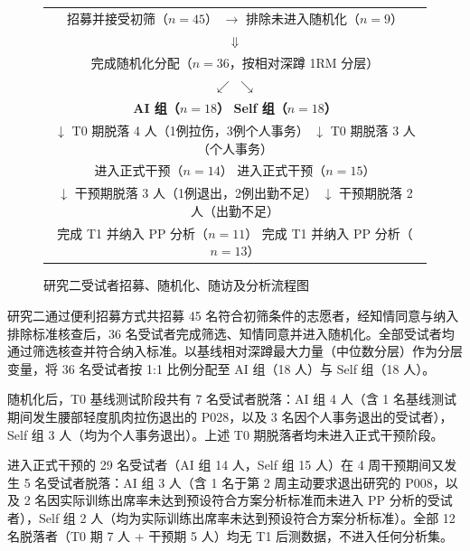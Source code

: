 \documentclass[UTF8,zihao=-4,twoside,openany]{ctexbook}
\begin{document}
\begin{figure}[htbp]
  \centering
  \small
  \begin{tabular}{|c|}
    \hline
    招募并接受初筛（$n=45$） $\longrightarrow$ 排除未进入随机化（$n=9$） \\
    $\Downarrow$ \\
    完成随机化分配（$n=36$，按相对深蹲 1RM 分层） \\
    $\swarrow$ \hspace{5.5cm} $\searrow$ \\
    \textbf{AI 组（$n=18$）} \hspace{5.5cm} \textbf{Self 组（$n=18$）} \\
    $\downarrow$ T0 期脱落 4 人（1例拉伤，3例个人事务） \hspace{0.5cm} $\downarrow$ T0 期脱落 3 人（个人事务） \\
    进入正式干预（$n=14$） \hspace{4.2cm} 进入正式干预（$n=15$） \\
    $\downarrow$ 干预期脱落 3 人（1例退出，2例出勤不足） \hspace{0.5cm} $\downarrow$ 干预期脱落 2 人（出勤不足） \\
    完成 T1 并纳入 PP 分析（$n=11$） \hspace{3.2cm} 完成 T1 并纳入 PP 分析（$n=13$） \\
    \hline
  \end{tabular}
  \vspace{6pt}
  \caption{研究二受试者招募、随机化、随访及分析流程图}
  \label{fig:ch4-consort}
\end{figure}

研究二通过便利招募方式共招募 45 名符合初筛条件的志愿者，经知情同意与纳入排除标准核查后，36 名受试者完成筛选、知情同意并进入随机化。全部受试者均通过筛选核查并符合纳入标准。以基线相对深蹲最大力量（中位数分层）作为分层变量，将 36 名受试者按 1:1 比例分配至 AI 组（18 人）与 Self 组（18 人）。

随机化后，T0 基线测试阶段共有 7 名受试者脱落：AI 组 4 人（含 1 名基线测试期间发生腰部轻度肌肉拉伤退出的 P028，以及 3 名因个人事务退出的受试者），Self 组 3 人（均为个人事务退出）。上述 T0 期脱落者均未进入正式干预阶段。

进入正式干预的 29 名受试者（AI 组 14 人，Self 组 15 人）在 4 周干预期间又发生 5 名受试者脱落：AI 组 3 人（含 1 名于第 2 周主动要求退出研究的 P008，以及 2 名因实际训练出席率未达到预设符合方案分析标准而未进入 PP 分析的受试者），Self 组 2 人（均为实际训练出席率未达到预设符合方案分析标准）。全部 12 名脱落者（T0 期 7 人 + 干预期 5 人）均无 T1 后测数据，不进入任何分析集。
\end{document}
